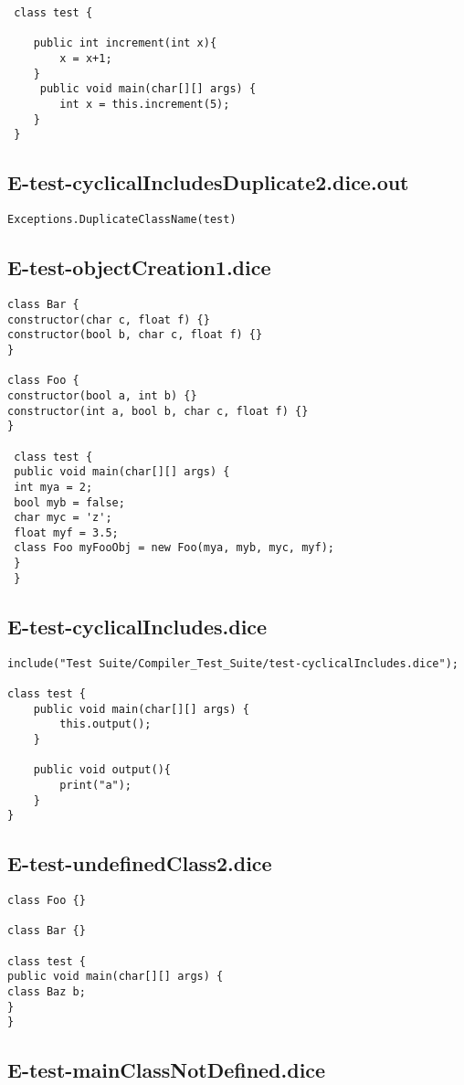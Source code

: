 \begin{verbatim}
 class test {

 	public int increment(int x){
 		x = x+1;
 	}
	 public void main(char[][] args) {
		int x = this.increment(5);
 	}
 }
\end{verbatim}\pagebreak\subsection{E-test-cyclicalIncludesDuplicate2.dice.out}
\begin{verbatim}
Exceptions.DuplicateClassName(test)

\end{verbatim}\pagebreak\subsection{E-test-objectCreation1.dice}
\begin{verbatim}
class Bar {
constructor(char c, float f) {}
constructor(bool b, char c, float f) {}
}

class Foo {
constructor(bool a, int b) {}
constructor(int a, bool b, char c, float f) {}
}

 class test {
 public void main(char[][] args) {
 int mya = 2;
 bool myb = false;
 char myc = 'z';
 float myf = 3.5;
 class Foo myFooObj = new Foo(mya, myb, myc, myf);
 }
 }
\end{verbatim}\pagebreak\subsection{E-test-cyclicalIncludes.dice}
\begin{verbatim}
include("Test Suite/Compiler_Test_Suite/test-cyclicalIncludes.dice");

class test {
	public void main(char[][] args) {
        this.output();
	}

	public void output(){
		print("a");
	}
}

\end{verbatim}\pagebreak\subsection{E-test-undefinedClass2.dice}
\begin{verbatim}
class Foo {}

class Bar {}

class test {
public void main(char[][] args) {
class Baz b;
}
}

\end{verbatim}\pagebreak\subsection{E-test-mainClassNotDefined.dice}
